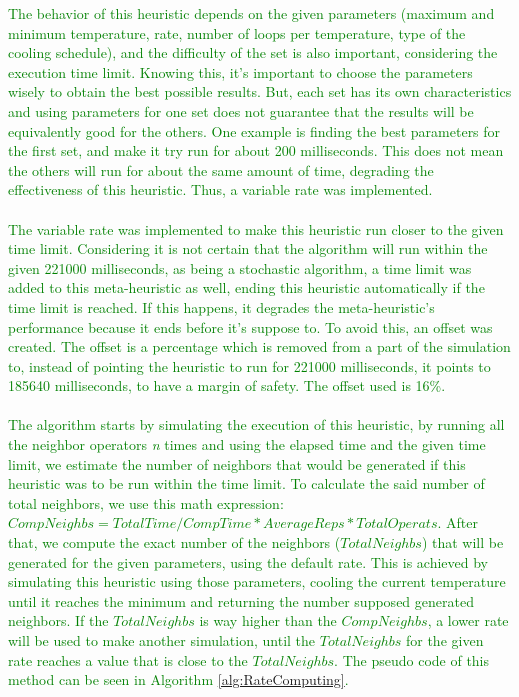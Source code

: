 \textcolor{green}{The behavior of this heuristic depends on the given parameters (maximum and minimum temperature, rate, number of loops per temperature, type of the cooling schedule), and the difficulty of the set is also important, considering the execution time limit. Knowing this, it's important to choose the parameters wisely to obtain the best possible results. But, each set has its own characteristics and using parameters for one set does not guarantee that the results will be equivalently good for the others. One example is finding the best parameters for the first set, and make it try run for about 200 milliseconds. This does not mean the others will run for about the same amount of time, degrading the effectiveness of this heuristic. Thus, a variable rate was implemented.\\
\\
The variable rate was implemented to make this heuristic run closer to the given time limit. Considering it is not certain that the algorithm will run within the given 221000 milliseconds, as being a stochastic algorithm, a time limit was added to this meta-heuristic as well, ending this heuristic automatically if the time limit is reached. If this happens, it degrades the meta-heuristic's performance because it ends before it's suppose to. To avoid this, an offset was created. The offset is a percentage which is removed from a part of the simulation to, instead of pointing the heuristic to run for 221000 milliseconds, it points to 185640 milliseconds, to have a margin of safety. The offset used is 16\%.\\
\\
The algorithm starts by simulating the execution of this heuristic, by running all the neighbor operators \textit{n} times and using the elapsed time and the given time limit, we estimate the number of neighbors that would be generated if this heuristic was to be run within the time limit. To calculate the said number of total neighbors, we use this math expression: $CompNeighbs = TotalTime / CompTime * AverageReps * TotalOperats$. After that, we compute the exact number of the neighbors ($TotalNeighbs$) that will be generated for the given parameters, using the default rate. This is achieved by simulating this heuristic using those parameters, cooling the current temperature until it reaches the minimum and returning the number supposed generated neighbors. If the $TotalNeighbs$ is way higher than the $CompNeighbs$, a lower rate will be used to make another simulation, until the $TotalNeighbs$ for the given rate reaches a value that is close to the $TotalNeighbs$. The pseudo code of this method can be seen in Algorithm \ref{alg:RateComputing}.\\
}

